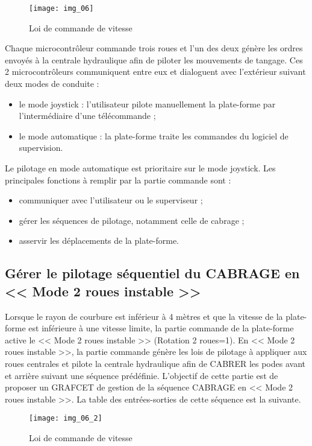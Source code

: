 \begin{figure}[H]
\centering
\texttt{[image: img\_06]}
\caption{Loi de commande de vitesse \label{img:06}}
\end{figure}

Chaque microcontrôleur commande trois roues et l’un des deux génère les ordres envoyés à la centrale hydraulique afin de piloter les mouvements de tangage. Ces 2 microcontrôleurs communiquent entre eux et dialoguent avec l’extérieur suivant deux modes de conduite :
\begin{itemize}
\item le mode joystick : l’utilisateur pilote manuellement la plate-forme par l’intermédiaire d’une télécommande ;
\item le mode automatique : la plate-forme traite les commandes du logiciel de supervision.
\end{itemize}
Le pilotage en mode automatique est prioritaire sur le mode joystick. 
Les principales fonctions à remplir par la partie commande sont :
\begin{itemize}
\item communiquer avec l’utilisateur ou le superviseur ;
\item gérer les séquences de pilotage, notamment celle de cabrage ;
\item asservir les déplacements de la plate-forme.
\end{itemize}
\fi

\subsection{Gérer le pilotage séquentiel du CABRAGE en << Mode 2 roues instable >>}

\ifprof
\else

Lorsque le rayon de courbure est inférieur à 4 mètres et que la vitesse de la plate-forme est inférieure à une vitesse
limite, la partie commande de la plate-forme active le << Mode 2 roues instable >> (Rotation 2 roues=1). En << Mode 2 roues instable >>, la partie commande génère les lois de pilotage à appliquer aux roues centrales et pilote la centrale hydraulique afin de CABRER les podes avant et arrière suivant une séquence prédéfinie.
L’objectif de cette partie est de proposer un GRAFCET de gestion de la
séquence CABRAGE en << Mode 2 roues instable >>. La table des
entrées-sorties de cette séquence est la suivante.

\begin{figure}[H]
\centering
\texttt{[image: img\_06\_2]}
\caption{Loi de commande de vitesse \label{img:06:2}}
\end{figure}

